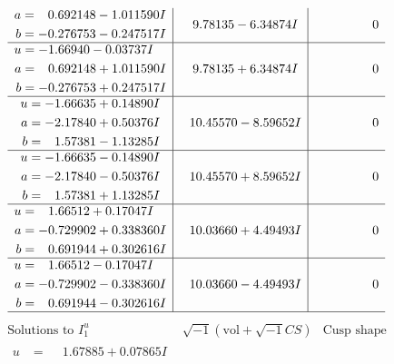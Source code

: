 \documentclass[1p]{elsarticle_modified}
\theoremstyle{definition}
\newcommand{\I}{\sqrt{-1}}
\begin{document}
$$\begin{array}{c|c|c}
\begin{aligned}
a &= \phantom{-}0.692148 - 1.011590 I \\
b &= -0.276753 - 0.247517 I\end{aligned}
 & \phantom{-}9.78135 - 6.34874 I & \phantom{-0.000000 } 0 \\ \hline\begin{aligned}
u &= -1.66940 - 0.03737 I \\
a &= \phantom{-}0.692148 + 1.011590 I \\
b &= -0.276753 + 0.247517 I\end{aligned}
 & \phantom{-}9.78135 + 6.34874 I & \phantom{-0.000000 } 0 \\ \hline\begin{aligned}
u &= -1.66635 + 0.14890 I \\
a &= -2.17840 + 0.50376 I \\
b &= \phantom{-}1.57381 - 1.13285 I\end{aligned}
 & \phantom{-}10.45570 - 8.59652 I & \phantom{-0.000000 } 0 \\ \hline\begin{aligned}
u &= -1.66635 - 0.14890 I \\
a &= -2.17840 - 0.50376 I \\
b &= \phantom{-}1.57381 + 1.13285 I\end{aligned}
 & \phantom{-}10.45570 + 8.59652 I & \phantom{-0.000000 } 0 \\ \hline\begin{aligned}
u &= \phantom{-}1.66512 + 0.17047 I \\
a &= -0.729902 + 0.338360 I \\
b &= \phantom{-}0.691944 + 0.302616 I\end{aligned}
 & \phantom{-}10.03660 + 4.49493 I & \phantom{-0.000000 } 0 \\ \hline\begin{aligned}
u &= \phantom{-}1.66512 - 0.17047 I \\
a &= -0.729902 - 0.338360 I \\
b &= \phantom{-}0.691944 - 0.302616 I\end{aligned}
 & \phantom{-}10.03660 - 4.49493 I & \phantom{-0.000000 } 0\\
 \hline 
 \end{array}$$\newpage$$\begin{array}{c|c|c}  
\text{Solutions to }I^u_{1}& \I (\text{vol} + \sqrt{-1}CS) & \text{Cusp shape}\\
 \hline 
\begin{aligned}
u &= \phantom{-}1.67885 + 0.07865 I \\

\end{aligned}
\end{array}$$
\end{document}
